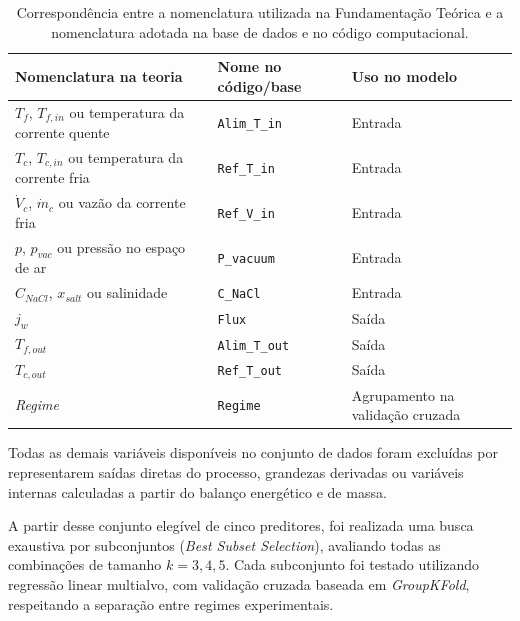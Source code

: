 \begin{table}[H]
\centering
\caption[Correspondência entre nomenclaturas das variáveis]{Correspondência entre a nomenclatura utilizada na Fundamentação Teórica e a nomenclatura adotada na base de dados e no código computacional.}
\label{tab:relacao_variaveis_teoria_codigo}
\begin{tabular}{p{5.2cm} p{4.2cm} p{3.2cm}}
\hline
\textbf{Nomenclatura na teoria} & \textbf{Nome no código/base} & \textbf{Uso no modelo} \\
\hline

\(T_f\), \(T_{f,in}\) ou temperatura da corrente quente
&
\texttt{Alim\_T\_in}
&
Entrada \\

\(T_c\), \(T_{c,in}\) ou temperatura da corrente fria
&
\texttt{Ref\_T\_in}
&
Entrada \\

\(\dot{V}_c\), \(\dot{m}_c\) ou vazão da corrente fria
&
\texttt{Ref\_V\_in}
&
Entrada \\

\(p\), \(p_{vac}\) ou pressão no espaço de ar
&
\texttt{P\_vacuum}
&
Entrada \\

\(C_{NaCl}\), \(x_{salt}\) ou salinidade
&
\texttt{C\_NaCl}
&
Entrada \\

\(j_w\)
&
\texttt{Flux}
&
Saída \\

\(T_{f,out}\)
&
\texttt{Alim\_T\_out}
&
Saída \\

\(T_{c,out}\)
&
\texttt{Ref\_T\_out}
&
Saída \\

\textit{Regime}
&
\texttt{Regime}
&
Agrupamento na validação cruzada \\

\hline
\end{tabular}
\end{table}

Todas as demais variáveis disponíveis no conjunto de dados foram excluídas por representarem saídas diretas do processo, grandezas derivadas ou variáveis internas calculadas a partir do balanço energético e de massa.

A partir desse conjunto elegível de cinco preditores, foi realizada uma busca exaustiva por subconjuntos (\textit{Best Subset Selection}), avaliando todas as combinações de tamanho $k = 3, 4, 5$. Cada subconjunto foi testado utilizando regressão linear multialvo, com validação cruzada baseada em \textit{GroupKFold}, respeitando a separação entre regimes experimentais.

